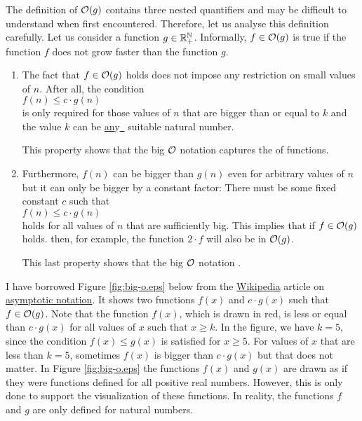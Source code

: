 The definition of $\mathcal{O}(g)$ contains three nested quantifiers and may be difficult to understand
when first encountered.  Therefore, let us analyse this definition carefully.  Let us consider a
function $g \in {\mathbb R}_+^{\mathbb N}$.  Informally, $f \in \mathcal{O}(g)$ is true if the function $f$ does not grow faster than
the function $g$.  
\begin{enumerate}
\item The fact that $f \in \mathcal{O}(g)$ holds does not impose any restriction on small values of $n$.
      After all, the condition
      \\[0.2cm]
      \hspace*{1.3cm}
      $f(n) \leq c \cdot g(n)$
      \\[0.2cm]
      is only required for those values of $n$ that are bigger than or equal to $k$ and the value
      $k$ can be \underline{an}y\hspace*{-0.1cm}\underline{\ } suitable natural number.

      This property shows that the big $\mathcal{O}$ notation captures the \colorbox{orange}{} of functions.
\item Furthermore, $f(n)$ can be bigger than $g(n)$ even for arbitrary values of $n$ 
      but it can only be bigger by a constant factor:  There must be some fixed constant $c$
      such that 
      \\[0.2cm]
      \hspace*{1.3cm}
      $f(n) \leq c \cdot g(n)$
      \\[0.2cm]
      holds for all values of $n$ that are sufficiently big.  This implies that if $f \in \mathcal{O}(g)$
      holds. then, for example, the function $2 \cdot f$ will also be in $\mathcal{O}(g)$.

      This last property shows that the big $\mathcal{O}$ notation \colorbox{orange}{}.
\end{enumerate}
I have borrowed Figure \ref{fig:big-o.eps} below from the \href{http://www.wikipedia.org}{Wikipedia} article on 
\href{http://en.wikipedia.org/wiki/Asymptotic_notation}{asymptotic notation}.  It shows two functions 
$f(x)$ and $c \cdot g(x)$ such that $f \in \mathcal{O}(g)$.  Note that the function $f(x)$, which is drawn
in red, is less or equal than $c \cdot g(x)$ for all values of $x$ such that $x \geq k$.  In the
figure, we have $k=5$, since the condition $f(x) \leq g(x)$ is satisfied for $x \geq 5$. For
values of $x$ that are less than $k = 5$, sometimes $f(x)$ is bigger than $c \cdot g(x)$ but that does
not matter.  In Figure \ref{fig:big-o.eps} the functions $f(x)$ and $g(x)$ are drawn as if they were
functions defined for all positive real numbers.  However, this is only done to support the
visualization of these functions.  In reality, the functions $f$ and $g$ are only defined for
natural numbers.


